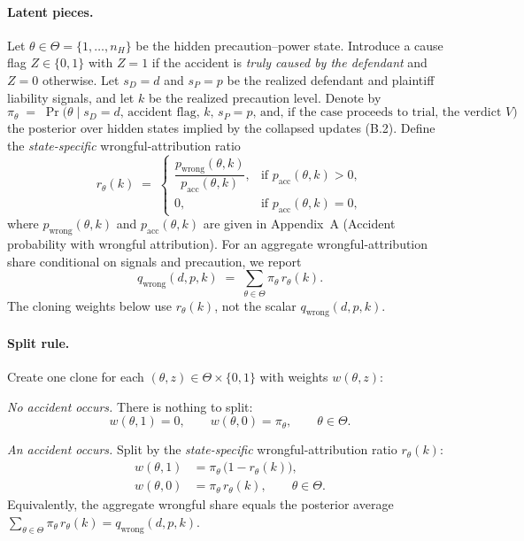 \documentclass{article}
\begin{document}
\paragraph{Latent pieces.}
Let $\theta\in\Theta=\{1,\dots,n_H\}$ be the hidden precaution--power state. Introduce a cause flag $Z\in\{0,1\}$ with $Z=1$ if the accident is \emph{truly caused by the defendant} and $Z=0$ otherwise. Let $s_D=d$ and $s_P=p$ be the realized defendant and plaintiff liability signals, and let $k$ be the realized precaution level. Denote by
\[
\pi_\theta \;=\; \Pr\!\bigl(\theta \mid s_D=d,\,\text{accident flag},\,k,\,s_P=p,\,\text{and, if the case proceeds to trial, the verdict }V\bigr)
\]
the posterior over hidden states implied by the collapsed updates (B.2). Define the \emph{state-specific} wrongful-attribution ratio
\[
r_\theta(k)\;=\;
\begin{cases}
\dfrac{p_{\mathrm{wrong}}(\theta,k)}{p_{\mathrm{acc}}(\theta,k)}, & \text{if } p_{\mathrm{acc}}(\theta,k) > 0,\\[1.2ex]
0, & \text{if } p_{\mathrm{acc}}(\theta,k) = 0,
\end{cases}
\]
where $p_{\mathrm{wrong}}(\theta,k)$ and $p_{\mathrm{acc}}(\theta,k)$ are given in Appendix~A (Accident probability with wrongful attribution). For an aggregate wrongful-attribution share conditional on signals and precaution, we report
\[
q_{\mathrm{wrong}}(d,p,k)\;=\;\sum_{\theta\in\Theta}\pi_\theta\,r_\theta(k).
\]
The cloning weights below use $r_\theta(k)$, not the scalar $q_{\mathrm{wrong}}(d,p,k)$.

\paragraph{Split rule.}
Create one clone for each $(\theta,z)\in\Theta\times\{0,1\}$ with weights $w(\theta,z)$:

\emph{No accident occurs.} There is nothing to split:
\[
w(\theta,1)=0,\qquad w(\theta,0)=\pi_\theta,\qquad \theta\in\Theta.
\]

\emph{An accident occurs.} Split by the \emph{state-specific} wrongful-attribution ratio $r_\theta(k)$:
\begin{align*}
w(\theta,1) &= \pi_\theta\,\bigl(1 - r_\theta(k)\bigr),\\
w(\theta,0) &= \pi_\theta\, r_\theta(k), \qquad \theta\in\Theta.
\end{align*}
Equivalently, the aggregate wrongful share equals the posterior average $\sum_{\theta\in\Theta}\pi_\theta\,r_\theta(k)=q_{\mathrm{wrong}}(d,p,k)$.
\end{document}
